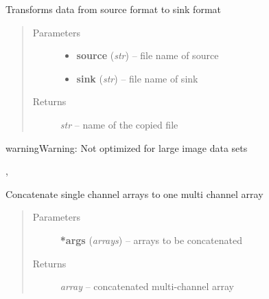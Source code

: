 \documentclass[letterpaper,10pt,english]{sphinxmanual}
\begin{document}
\begin{fulllineitems}
\label{api/ClearMap.IO:ClearMap.IO.IO.convertData}
Transforms data from source format to sink format
\begin{quote}\begin{description}
\item[{Parameters}] \leavevmode\begin{itemize}
\item {} 
\textbf{source} (\emph{str}) --
file name of source

\item {} 
\textbf{sink} (\emph{str}) --
file name of sink

\end{itemize}

\item[{Returns}] \leavevmode
\emph{str} --
name of the copied file

\end{description}\end{quote}

\begin{notice}{warning}{Warning:}
Not optimized for large image data sets
\end{notice}




{\hyperref[api/ClearMap.IO:ClearMap.IO.IO.copyFile]{\emph{}}}, {\hyperref[api/ClearMap.IO:ClearMap.IO.IO.copyData]{\emph{}}}



\end{fulllineitems}


\begin{fulllineitems}
\label{api/ClearMap.IO:ClearMap.IO.IO.toMultiChannelData}
Concatenate single channel arrays to one multi channel array
\begin{quote}\begin{description}
\item[{Parameters}] \leavevmode
\textbf{*args} (\emph{arrays}) --
arrays to be concatenated

\item[{Returns}] \leavevmode
\emph{array} --
concatenated multi-channel array

\end{description}\end{quote}

\end{fulllineitems}
\end{document}
